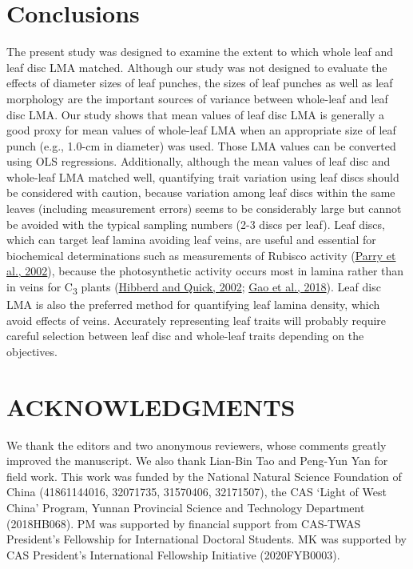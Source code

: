 \documentclass[
  12pt,
  a4paper,
,tablecaptionabove
]{scrartcl}
\begin{document}
\hypertarget{conclusions}{%
\section{Conclusions}\label{conclusions}}

The present study was designed to examine the extent to which whole leaf and leaf disc LMA matched.
Although our study was not designed to evaluate the effects of diameter sizes of leaf punches, the sizes of leaf punches as well as leaf morphology are the important sources of variance between whole-leaf and leaf disc LMA.
Our study shows that mean values of leaf disc LMA is generally a good proxy for mean values of whole-leaf LMA when an appropriate size of leaf punch (e.g., 1.0-cm in diameter) was used.
Those LMA values can be converted using OLS regressions.
Additionally, although the mean values of leaf disc and whole-leaf LMA matched well, quantifying trait variation using leaf discs should be considered with caution, because variation among leaf discs within the same leaves (including measurement errors) seems to be considerably large but cannot be avoided with the typical sampling numbers (2-3 discs per leaf).
Leaf discs, which can target leaf lamina avoiding leaf veins, are useful and essential for biochemical determinations such as measurements of Rubisco activity (\protect\hyperlink{ref-Parry2002}{Parry et al., 2002}), because the photosynthetic activity occurs most in lamina rather than in veins for C\textsubscript{3} plants (\protect\hyperlink{ref-Hibberd2002}{Hibberd and Quick, 2002}; \protect\hyperlink{ref-Gao2018}{Gao et al., 2018}).
Leaf disc LMA is also the preferred method for quantifying leaf lamina density, which avoid effects of veins.
Accurately representing leaf traits will probably require careful selection between leaf disc and whole-leaf traits depending on the objectives.

\hypertarget{acknowledgments}{%
\section{ACKNOWLEDGMENTS}\label{acknowledgments}}

We thank the editors and two anonymous reviewers, whose comments greatly improved the manuscript.
We also thank Lian-Bin Tao and Peng-Yun Yan for field work.
This work was funded by the National Natural Science Foundation of China (41861144016, 32071735, 31570406, 32171507), the CAS `Light of West China' Program, Yunnan Provincial Science and Technology Department (2018HB068).
PM was supported by financial support from CAS-TWAS President's Fellowship for International Doctoral Students.
MK was supported by CAS President's International Fellowship Initiative (2020FYB0003).
\end{document}
